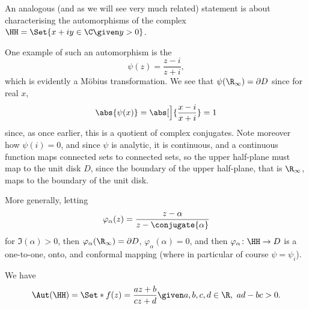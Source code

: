 
An analogous (and as we will see very much related) statement is about characterising the automorphisms of the complex  $\HH = \Set{x + i y \in \C \given y > 0}$.

\begin{example}
	One example of such an automorphism is the 
	\[
		\psi(z) = \frac{z - i}{z + i},
	\]
	which is evidently a Möbius transformation.
	We see that $\psi(\R_\infty) = \partial D$ since for real $x$,
	\[
		\abs{\psi(x)} = \abs[\Big]{\frac{x - i}{x + i}} = 1
	\]
	since, as once earlier, this is a quotient of complex conjugates.
	Note moreover how $\psi(i) = 0$, and since $\psi$ is analytic, it is continuous, and a continuous function maps connected sets to connected sets, so the upper half-plane must map to the unit disk $D$, since the boundary of the upper half-plane, that is $\R_\infty$, maps to the boundary of the unit disk.

	More generally, letting
	\[
		\varphi_\alpha (z) = \frac{z - \alpha}{z - \conjugate{\alpha}}
	\]
	for $\Im(\alpha) > 0$, then $\varphi_\alpha(\R_\infty) = \partial D$, $\varphi_\alpha(\alpha) = 0$, and then $\varphi_\alpha \colon \HH \to D$ is a one-to-one, onto, and conformal mapping (where in particular of course $\psi = \psi_i$).
\end{example}

\begin{theorem}\label{thm6.5}
	We have
	\[
		\Aut(\HH) = \Set*{f(z) = \frac{a z + b}{c z + d} \given a, b, c, d \in \R,~ a d - b c > 0}.
	\]
\end{theorem}

